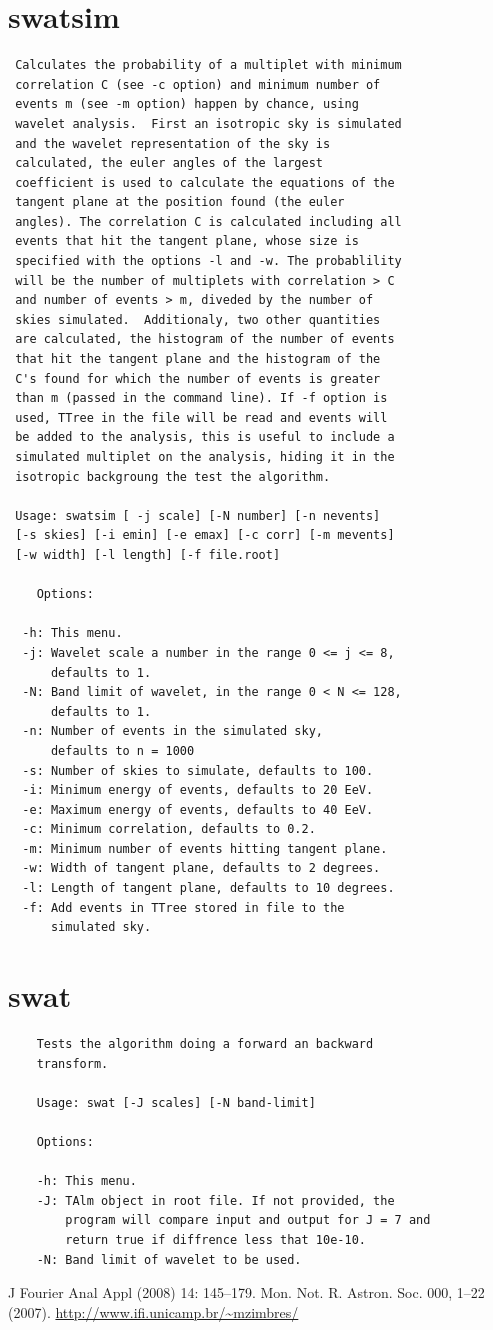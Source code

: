 \documentclass[12pt]{article}
\begin{document}
\section{swatsim}
{\bf \color{brown}
   \begin{lstlisting}
 Calculates the probability of a multiplet with minimum
 correlation C (see -c option) and minimum number of
 events m (see -m option) happen by chance, using
 wavelet analysis.  First an isotropic sky is simulated
 and the wavelet representation of the sky is
 calculated, the euler angles of the largest
 coefficient is used to calculate the equations of the
 tangent plane at the position found (the euler
 angles). The correlation C is calculated including all
 events that hit the tangent plane, whose size is
 specified with the options -l and -w. The probablility
 will be the number of multiplets with correlation > C
 and number of events > m, diveded by the number of
 skies simulated.  Additionaly, two other quantities
 are calculated, the histogram of the number of events
 that hit the tangent plane and the histogram of the
 C's found for which the number of events is greater
 than m (passed in the command line). If -f option is
 used, TTree in the file will be read and events will
 be added to the analysis, this is useful to include a
 simulated multiplet on the analysis, hiding it in the
 isotropic backgroung the test the algorithm.

 Usage: swatsim [ -j scale] [-N number] [-n nevents]
 [-s skies] [-i emin] [-e emax] [-c corr] [-m mevents]
 [-w width] [-l length] [-f file.root]

    Options:

  -h: This menu.
  -j: Wavelet scale a number in the range 0 <= j <= 8,
      defaults to 1.
  -N: Band limit of wavelet, in the range 0 < N <= 128,
      defaults to 1.
  -n: Number of events in the simulated sky,
      defaults to n = 1000
  -s: Number of skies to simulate, defaults to 100.
  -i: Minimum energy of events, defaults to 20 EeV.
  -e: Maximum energy of events, defaults to 40 EeV.
  -c: Minimum correlation, defaults to 0.2.
  -m: Minimum number of events hitting tangent plane.
  -w: Width of tangent plane, defaults to 2 degrees.
  -l: Length of tangent plane, defaults to 10 degrees.
  -f: Add events in TTree stored in file to the
      simulated sky.
   \end{lstlisting}
}

\section{swat}
{\bf \color{brown}
   \begin{lstlisting}
    Tests the algorithm doing a forward an backward
    transform.

    Usage: swat [-J scales] [-N band-limit]

    Options:

    -h: This menu.
    -J: TAlm object in root file. If not provided, the
        program will compare input and output for J = 7 and
        return true if diffrence less that 10e-10.  
    -N: Band limit of wavelet to be used.
   \end{lstlisting}
}

\begin{thebibliography}{99}
 J Fourier Anal Appl (2008) 14: 145–179.
 Mon. Not. R. Astron. Soc. 000, 1–22 (2007). 
 \url{http://www.ifi.unicamp.br/~mzimbres/}
\end{thebibliography}
\end{document}
